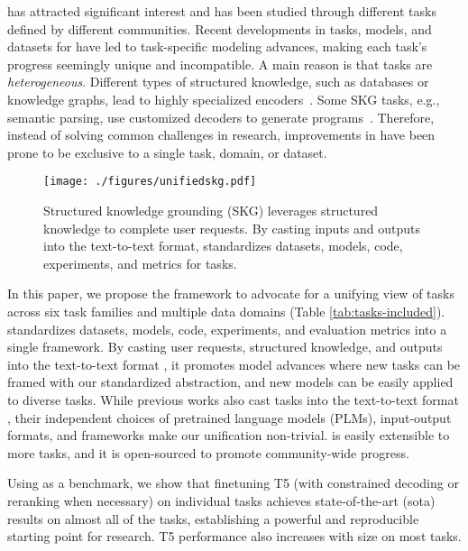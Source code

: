 \skg has attracted significant interest and has been studied through different tasks defined by different communities.
Recent developments in tasks, models, and datasets for \skg have led to task-specific modeling advances, making each task's progress seemingly unique and incompatible.
A main reason is that \skg tasks are \textit{heterogeneous}.
Different types of structured knowledge, such as databases or knowledge graphs, lead to highly specialized encoders~\citep{kagnet-emnlp19,Herzig2020tapas,Wang2020RATSQLRS,yasunaga-etal-2021-qa}.
Some SKG tasks, e.g., semantic parsing, use customized decoders to generate programs~\cite{YinN18,ren2021lego}.
Therefore, instead of solving common challenges in \skg research, improvements in \skg have been prone to be exclusive to a single task, domain, or dataset.

\begin{figure*}[!t]
    \centering
    \texttt{[image: ./figures/unifiedskg.pdf]}
    \caption{Structured knowledge grounding (SKG) leverages structured knowledge to complete user requests.
    By casting inputs and outputs into the text-to-text format, \uskg standardizes datasets, models, code, experiments, and metrics for \ntasks \skg tasks.
    }
\label{fig:skg}
\end{figure*}

In this paper, we propose the \uskg framework to advocate for a unifying view of \ntasks \skg tasks across six task families and multiple data domains (Table \ref{tab:tasks-included}).
\uskg standardizes datasets, models, code, experiments, and evaluation metrics into a single framework.
By casting user requests, structured knowledge, and outputs into the text-to-text format \cite{2020t5}, it promotes model advances where new tasks can be framed with our standardized abstraction, and new models can be easily applied to diverse \skg tasks.
While previous works also cast \skg tasks into the text-to-text format \cite{hosseini2020simple,Shaw2021CompositionalGA,liu2021tapex}, their independent choices of pretrained language models (PLMs), input-output formats, and frameworks make our unification non-trivial. 
\uskg is easily extensible to more \skg tasks, and it is open-sourced to promote community-wide progress.

Using \uskg as a benchmark, we show that finetuning T5 (with constrained decoding or reranking when necessary) on individual tasks achieves state-of-the-art (sota) results on almost all of the \ntasks tasks, establishing a powerful and reproducible starting point for \skg research. T5 performance also increases with size on most tasks. 

